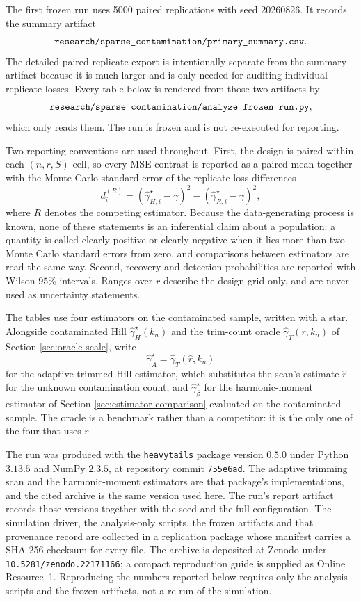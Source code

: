 \documentclass[11pt]{article}
\newcommand{\ghat}{\widehat{\gamma}}
\begin{document}
The first frozen run uses 5000 paired replications with seed 20260826.  It
records the summary artifact
\[
  \hbox{\texttt{research/sparse\_contamination/primary\_summary.csv}}.
\]
The detailed paired-replicate export is intentionally separate from the
summary artifact because it is much larger and is only needed for auditing
individual replicate losses.  Every table below is rendered from those two
artifacts by
\[
  \hbox{\texttt{research/sparse\_contamination/analyze\_frozen\_run.py}},
\]
which only reads them.  The run is frozen and is not re-executed for
reporting.

Two reporting conventions are used throughout.  First, the design is paired
within each $(n,r,S)$ cell, so every MSE contrast is reported as a paired mean
together with the Monte Carlo standard error of the replicate loss differences
\[
  d_i^{(R)}
  =
  (\ghat_{H,i}^\star-\gamma)^2
  -
  (\ghat_{R,i}^\star-\gamma)^2,
\]
where $R$ denotes the competing estimator.  Because the data-generating
process is known, none of these statements is an inferential claim about a
population: a quantity is called clearly positive or clearly negative when it
lies more than two Monte Carlo standard errors from zero, and comparisons
between estimators are read the same way.  Second, recovery and detection
probabilities are reported with Wilson $95\%$ intervals.  Ranges over $r$
describe the design grid only, and are never used as uncertainty statements.

The tables use four estimators on the contaminated sample, written with a star.
Alongside contaminated Hill $\ghat_H^\star(k_n)$ and the trim-count oracle
$\ghat_T(r,k_n)$ of Section \ref{sec:oracle-scale}, write
\[
  \ghat_A^\star=\ghat_T(\widehat r,k_n)
\]
for the adaptive trimmed Hill estimator, which substitutes the scan's estimate
$\widehat r$ for the unknown contamination count, and $\ghat_\beta^\star$ for
the harmonic-moment estimator of Section \ref{sec:estimator-comparison}
evaluated on the contaminated sample.  The oracle is a benchmark rather than a
competitor: it is the only one of the four that uses $r$.

The run was produced with the \texttt{heavytails} package version $0.5.0$
\citep{heavytails-2026} under Python $3.13.5$ and NumPy $2.3.5$, at repository
commit \texttt{755e6ad}.  The adaptive trimming scan and the harmonic-moment
estimators are that package's implementations, and the cited archive is the
same version used here.  The run's report artifact records those versions
together with the seed and the full configuration.  The simulation driver, the
analysis-only scripts, the frozen artifacts and that provenance record are
collected in a replication package whose manifest carries a SHA-256 checksum
for every file.  The archive is deposited at Zenodo under
\texttt{10.5281/zenodo.22171166}; a compact reproduction guide is supplied as Online
Resource~1.
Reproducing the numbers reported below requires only the analysis scripts and
the frozen artifacts, not a re-run of the simulation.
\end{document}
